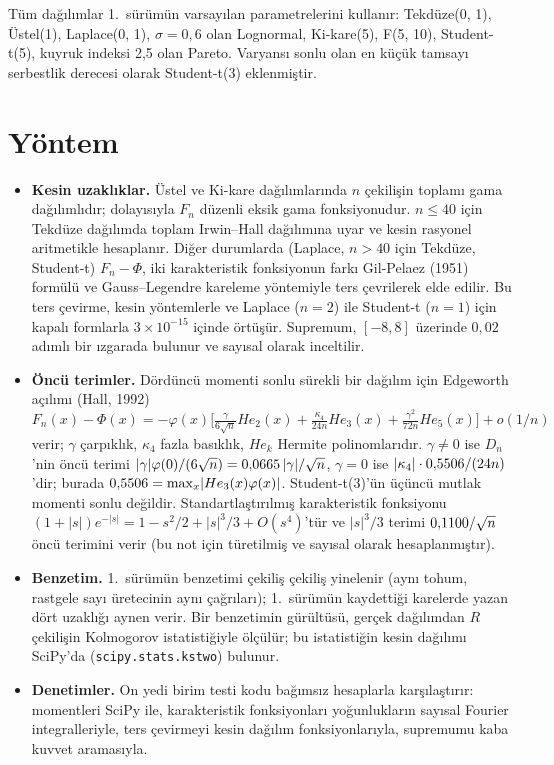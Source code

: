 \documentclass[11pt,a4paper]{article}
\begin{document}
Tüm dağılımlar 1.\ sürümün varsayılan parametrelerini kullanır: Tekdüze(0, 1), Üstel(1), Laplace(0, 1), $\sigma = 0{,}6$ olan
Lognormal, Ki-kare(5), F(5, 10), Student-t(5), kuyruk indeksi 2,5 olan Pareto. Varyansı sonlu olan en küçük tamsayı serbestlik
derecesi olarak Student-t(3) eklenmiştir.

\section{Yöntem}

\begin{itemize}
  \item \textbf{Kesin uzaklıklar.} Üstel ve Ki-kare dağılımlarında $n$ çekilişin toplamı gama dağılımlıdır; dolayısıyla $F_n$ düzenli
  eksik gama fonksiyonudur. $n \le 40$ için Tekdüze dağılımda toplam Irwin--Hall dağılımına uyar ve kesin rasyonel aritmetikle
  hesaplanır. Diğer durumlarda (Laplace, $n > 40$ için Tekdüze, Student-t) $F_n - \Phi$, iki karakteristik fonksiyonun farkı Gil-Pelaez
  (1951) formülü ve Gauss--Legendre kareleme yöntemiyle ters çevrilerek elde edilir. Bu ters çevirme, kesin yöntemlerle ve Laplace
  ($n = 2$) ile Student-t ($n = 1$) için kapalı formlarla $3\times 10^{-15}$ içinde örtüşür. Supremum, $[-8, 8]$ üzerinde $0{,}02$
  adımlı bir ızgarada bulunur ve sayısal olarak inceltilir.
  \item \textbf{Öncü terimler.} Dördüncü momenti sonlu sürekli bir dağılım için Edgeworth açılımı (Hall, 1992)
  $F_n(x) - \Phi(x) = -\varphi(x)\bigl[\tfrac{\gamma}{6\sqrt n}He_2(x) + \tfrac{\kappa_4}{24n}He_3(x) + \tfrac{\gamma^2}{72n}He_5(x)\bigr]
  + o(1/n)$ verir; $\gamma$ çarpıklık, $\kappa_4$ fazla basıklık, $He_k$ Hermite polinomlarıdır. $\gamma \ne 0$ ise $D_n$'nin öncü
  terimi $\lvert\gamma\rvert\varphi(0)/(6\sqrt n) = 0{,}0665\,\lvert\gamma\rvert/\sqrt n$, $\gamma = 0$ ise
  $\lvert\kappa_4\rvert \cdot 0{,}5506/(24n)$'dir; burada $0{,}5506 = \max_x\lvert He_3(x)\varphi(x)\rvert$. Student-t(3)'ün
  üçüncü mutlak momenti sonlu değildir. Standartlaştırılmış karakteristik fonksiyonu $(1+\lvert s\rvert)e^{-\lvert s\rvert} = 1 - s^2/2 +
  \lvert s\rvert^3/3 + O(s^4)$'tür ve $\lvert s\rvert^3/3$ terimi $0{,}1100/\sqrt n$ öncü terimini verir (bu not için türetilmiş ve
  sayısal olarak hesaplanmıştır).
  \item \textbf{Benzetim.} 1.\ sürümün benzetimi çekiliş çekiliş yinelenir (aynı tohum, rastgele sayı üretecinin aynı çağrıları); 1.\
  sürümün kaydettiği karelerde yazan dört uzaklığı aynen verir. Bir benzetimin gürültüsü, gerçek dağılımdan $R$ çekilişin Kolmogorov
  istatistiğiyle ölçülür; bu istatistiğin kesin dağılımı SciPy'da (\texttt{scipy.stats.kstwo}) bulunur.
  \item \textbf{Denetimler.} On yedi birim testi kodu bağımsız hesaplarla karşılaştırır: momentleri SciPy ile, karakteristik
  fonksiyonları yoğunlukların sayısal Fourier integralleriyle, ters çevirmeyi kesin dağılım fonksiyonlarıyla, supremumu kaba kuvvet
  aramasıyla.
\end{itemize}
\end{document}
